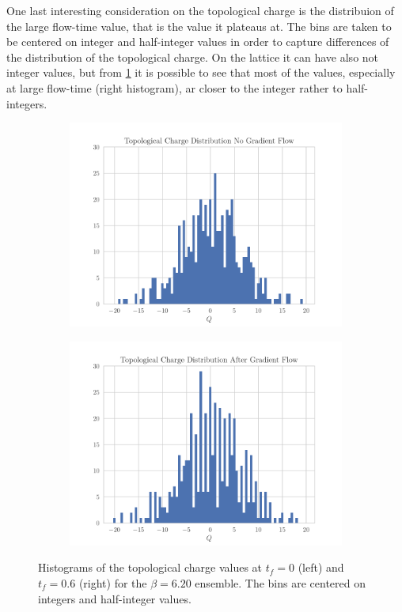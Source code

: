 One last interesting consideration on the topological charge is the distribuion of the large flow-time value, that is the value it plateaus at. The bins are taken to be centered on integer and half-integer values in order to capture differences of the distribution of the topological charge. On the lattice it can have also not integer values, but from \cref{fig:topchist} it is possible to see that most of the values, especially at large flow-time (right histogram), ar closer to the integer rather to half-integers.
\begin{figure}[hbt!]
    \centering
    \begin{subfigure}{0.45\textwidth}
        \includegraphics[width=\textwidth]{results/TopcHistNoFlow.pdf}
    \end{subfigure}
    \begin{subfigure}{0.45\textwidth}
        \includegraphics[width=\textwidth]{results/TopcHistFlow.pdf}
    \end{subfigure}
    \caption{\footnotesize Histograms of the topological charge values at $t_f=0$ (left) and $t_f=0.6$ (right) for the $\beta=6.20$ ensemble. The bins are centered on integers and half-integer values.}
    \label{fig:topchist}
\end{figure} 

